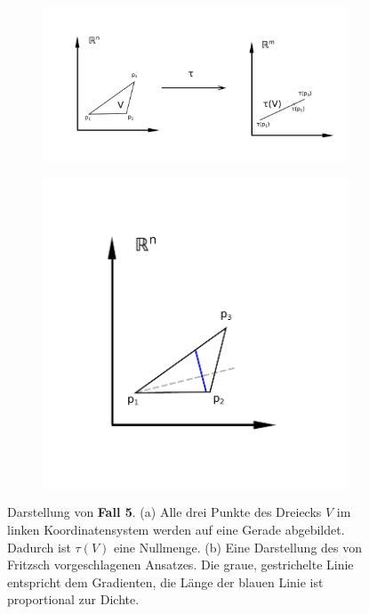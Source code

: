 \documentclass[a4paper,fontsize=12pt,toc=bib,parskip=half,ngerman]{scrartcl}
\begin{document}
\begin{figure}
	\begin{subfigure}{0.66\textwidth}
		\includegraphics[width=\textwidth]{pictures/Case5}
		\subcaption{}
		\label{Case5}
	\end{subfigure}
	\begin{subfigure}{0.33\textwidth}
		\includegraphics[width=\textwidth]{pictures/Case5-Solution}
		\subcaption{}
		\label{Case5Solution}
	\end{subfigure}
	\caption{Darstellung von \textbf{Fall 5}. (a) Alle drei Punkte des Dreiecks $V$ im linken Koordinatensystem werden auf eine Gerade abgebildet. Dadurch ist $\tau(V)$ eine Nullmenge. (b) Eine Darstellung des von Fritzsch vorgeschlagenen Ansatzes. Die graue, gestrichelte Linie entspricht dem Gradienten, die L\"ange der blauen Linie ist proportional zur Dichte. }
\end{figure}
\end{document}
